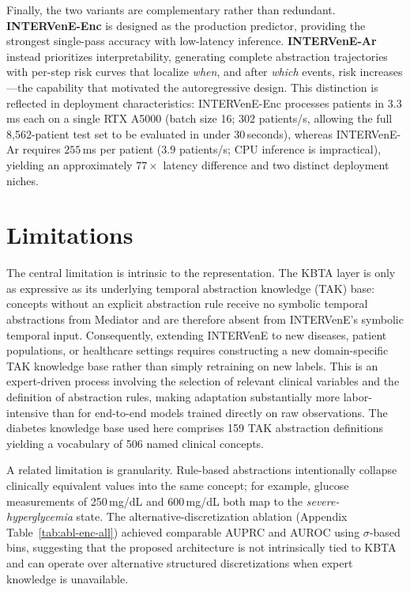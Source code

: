 \documentclass[letterpaper]{article} %
\begin{document}
Finally, the two variants are complementary rather than redundant. \textbf{INTERVenE-Enc} is designed as the production predictor, providing the strongest single-pass accuracy with low-latency inference. \textbf{INTERVenE-Ar} instead prioritizes interpretability, generating complete abstraction trajectories with per-step risk curves that localize \emph{when}, and after \emph{which} events, risk increases---the capability that motivated the autoregressive design. This distinction is reflected in deployment characteristics: INTERVenE-Enc processes patients in $3.3$\,ms each on a single RTX A5000 (batch size 16; $302$ patients/s, allowing the full 8{,}562-patient test set to be evaluated in under 30\,seconds), whereas INTERVenE-Ar requires $255$\,ms per patient ($3.9$ patients/s; CPU inference is impractical), yielding an approximately $77\times$ latency difference and two distinct deployment niches.

\section{Limitations}

The central limitation is intrinsic to the representation. The KBTA layer is only as expressive as its underlying temporal abstraction knowledge (TAK) base: concepts without an explicit abstraction rule receive no symbolic temporal abstractions from Mediator and are therefore absent from INTERVenE's symbolic temporal input. Consequently, extending INTERVenE to new diseases, patient populations, or healthcare settings requires constructing a new domain-specific TAK knowledge base rather than simply retraining on new labels. This is an expert-driven process involving the selection of relevant clinical variables and the definition of abstraction rules, making adaptation substantially more labor-intensive than for end-to-end models trained directly on raw observations. The diabetes knowledge base used here comprises 159 TAK abstraction definitions yielding a vocabulary of 506 named clinical concepts.

A related limitation is granularity. Rule-based abstractions intentionally collapse clinically equivalent values into the same concept; for example, glucose measurements of 250\,mg/dL and 600\,mg/dL both map to the \emph{severe-hyperglycemia} state. The alternative-discretization ablation (Appendix Table~\ref{tab:abl-enc-all}) achieved comparable AUPRC and AUROC using $\sigma$-based bins, suggesting that the proposed architecture is not intrinsically tied to KBTA and can operate over alternative structured discretizations when expert knowledge is unavailable.
\end{document}
